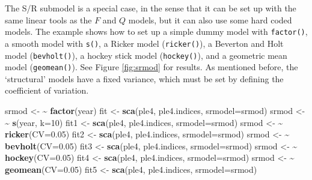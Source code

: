 \documentclass[
]{book}
\newenvironment{Shaded}{\begin{snugshade}}{\end{snugshade}}
\newcommand{\AttributeTok}[1]{\textcolor[rgb]{0.13,0.29,0.53}{#1}}
\newcommand{\DecValTok}[1]{\textcolor[rgb]{0.00,0.00,0.81}{#1}}
\newcommand{\ErrorTok}[1]{\textcolor[rgb]{0.64,0.00,0.00}{\textbf{#1}}}
\newcommand{\FloatTok}[1]{\textcolor[rgb]{0.00,0.00,0.81}{#1}}
\newcommand{\FunctionTok}[1]{\textcolor[rgb]{0.13,0.29,0.53}{\textbf{#1}}}
\newcommand{\NormalTok}[1]{#1}
\newcommand{\OtherTok}[1]{\textcolor[rgb]{0.56,0.35,0.01}{#1}}
\begin{document}
The S/R submodel is a special case, in the sense that it can be set up with the same linear tools as the \(F\) and \(Q\) models, but it can also use some hard coded models. The example shows how to set up a simple dummy model with \texttt{factor()}, a smooth model with \texttt{s()}, a Ricker model (\texttt{ricker()}), a Beverton and Holt model (\texttt{bevholt()}), a hockey stick model (\texttt{hockey()}), and a geometric mean model (\texttt{geomean()}). See Figure \ref{fig:srmod} for results. As mentioned before, the `structural' models have a fixed variance, which must be set by defining the coefficient of variation.

\begin{Shaded}
\begin{Highlighting}[]
\NormalTok{srmod }\OtherTok{\textless{}{-}} \ErrorTok{\textasciitilde{}} \FunctionTok{factor}\NormalTok{(year)}
\NormalTok{fit }\OtherTok{\textless{}{-}} \FunctionTok{sca}\NormalTok{(ple4, ple4.indices, }\AttributeTok{srmodel=}\NormalTok{srmod)}
\NormalTok{srmod }\OtherTok{\textless{}{-}} \ErrorTok{\textasciitilde{}} \FunctionTok{s}\NormalTok{(year, }\AttributeTok{k=}\DecValTok{10}\NormalTok{)}
\NormalTok{fit1 }\OtherTok{\textless{}{-}} \FunctionTok{sca}\NormalTok{(ple4, ple4.indices, }\AttributeTok{srmodel=}\NormalTok{srmod)}
\NormalTok{srmod }\OtherTok{\textless{}{-}} \ErrorTok{\textasciitilde{}} \FunctionTok{ricker}\NormalTok{(}\AttributeTok{CV=}\FloatTok{0.05}\NormalTok{)}
\NormalTok{fit2 }\OtherTok{\textless{}{-}} \FunctionTok{sca}\NormalTok{(ple4, ple4.indices, }\AttributeTok{srmodel=}\NormalTok{srmod)}
\NormalTok{srmod }\OtherTok{\textless{}{-}} \ErrorTok{\textasciitilde{}} \FunctionTok{bevholt}\NormalTok{(}\AttributeTok{CV=}\FloatTok{0.05}\NormalTok{)}
\NormalTok{fit3 }\OtherTok{\textless{}{-}} \FunctionTok{sca}\NormalTok{(ple4, ple4.indices, }\AttributeTok{srmodel=}\NormalTok{srmod)}
\NormalTok{srmod }\OtherTok{\textless{}{-}} \ErrorTok{\textasciitilde{}} \FunctionTok{hockey}\NormalTok{(}\AttributeTok{CV=}\FloatTok{0.05}\NormalTok{)}
\NormalTok{fit4 }\OtherTok{\textless{}{-}} \FunctionTok{sca}\NormalTok{(ple4, ple4.indices, }\AttributeTok{srmodel=}\NormalTok{srmod)}
\NormalTok{srmod }\OtherTok{\textless{}{-}} \ErrorTok{\textasciitilde{}} \FunctionTok{geomean}\NormalTok{(}\AttributeTok{CV=}\FloatTok{0.05}\NormalTok{)}
\NormalTok{fit5 }\OtherTok{\textless{}{-}} \FunctionTok{sca}\NormalTok{(ple4, ple4.indices, }\AttributeTok{srmodel=}\NormalTok{srmod)}
\end{Highlighting}
\end{Shaded}
\end{document}
